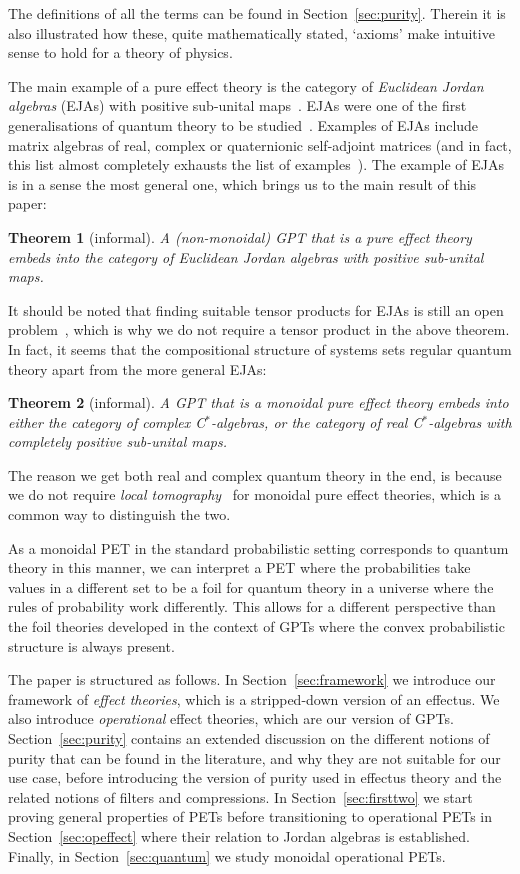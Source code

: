 \documentclass[a4paper,onecolumn,10pt,accepted=2019-05-03, issue=1, volume=1, shorttitle=papers/compositionality-1-1]{compositionalityarticle}
\numberwithin{counter}{section}
\newtheorem*{theorem*}{Theorem}
\begin{document}
The definitions of all the terms can be found in Section~\ref{sec:purity}. Therein it is also illustrated how these, quite mathematically stated, `axioms' make intuitive sense to hold for a theory of physics.

The main example of a pure effect theory is the category of \emph{Euclidean Jordan algebras} (EJAs) with positive sub-unital maps~\cite{westerbaan2018puremaps}. EJAs were one of the first generalisations of quantum theory to be studied~\cite{jordan1933}. Examples of EJAs include matrix algebras of real, complex or quaternionic self-adjoint matrices (and in fact, this list almost completely exhausts the list of examples~\cite{jordan1993algebraic}). The example of EJAs is in a sense the most general one, which brings us to the main result of this paper:
\begin{theorem*}[informal]
    A (non-monoidal) GPT that is a pure effect theory embeds into the category of Euclidean Jordan algebras with positive sub-unital maps.
\end{theorem*}

\noindent It should be noted that finding suitable tensor products for EJAs is still an open problem~\cite{barnum2016composites}, which is why we do not require a tensor product in the above theorem. In fact, it seems that the compositional structure of systems sets regular quantum theory apart from the more general EJAs:

\begin{theorem*}[informal]
    A GPT that is a monoidal pure effect theory embeds into either the category of complex C$^*$-algebras, or the category of real C$^*$-algebras with completely positive sub-unital maps.
\end{theorem*}
\noindent The reason we get both real and complex quantum theory in the end, is because we do not require \emph{local tomography}~\cite{hardy2012limited} for monoidal pure effect theories, which is a common way to distinguish the two.

As a monoidal PET in the standard probabilistic setting corresponds to quantum theory in this manner, we can interpret a PET where the probabilities take values in a different set to be a foil for quantum theory in a universe where the rules of probability work differently. This allows for a different perspective than the foil theories developed in the context of GPTs where the convex probabilistic structure is always present.

The paper is structured as follows. In Section~\ref{sec:framework} we introduce our framework of \emph{effect theories}, which is a stripped-down version of an effectus. We also introduce \emph{operational} effect theories, which are our version of GPTs. 
Section~\ref{sec:purity} contains an extended discussion on the different notions of purity that can be found in the literature, and why they are not suitable for our use case, before introducing the version of purity used in effectus theory and the related notions of filters and compressions.
In Section~\ref{sec:firsttwo} we start proving general properties of PETs before transitioning to operational PETs in Section~\ref{sec:opeffect} where their relation to Jordan algebras is established. Finally, in Section~\ref{sec:quantum} we study monoidal operational PETs.
\end{document}
